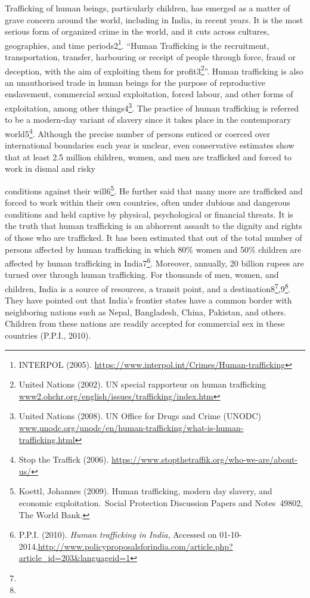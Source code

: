 \begin{multicols}{2}
\noi
Trafficking of human beings, particularly children, has emerged as a matter of grave concern around the world, including in India, in recent years. It is the most serious form of organized crime in the world, and it cuts across cultures, geographies, and time periods2\footnote{INTERPOL (2005). \url{https://www.interpol.int/Crimes/Human-trafficking}}. “Human Trafficking is the recruitment, transportation, transfer, harbouring or receipt of people through force, fraud or deception, with the aim of exploiting them for profit3\footnote{United Nations (2002). UN special rapporteur on human trafficking	\url{www2.ohchr.org/english/issues/trafficking/index.htm}}”. Human trafficking is also an unauthorised trade in human beings for the purpose of reproductive enslavement, commercial sexual exploitation, forced labour, and other forms of exploitation, among other things4\footnote{United Nations (2008). UN Office for Drugs and Crime (UNODC)	                                                                                                                                   \url{www.unodc.org/unodc/en/human-trafficking/what-is-human-trafficking.html}}. The practice of human trafficking is referred to be a modern-day variant of slavery since it takes place in the contemporary world5\footnote{Stop the Traffick (2006).  \url{https://www.stopthetraffik.org/who-we-are/about-us/}}. Although the precise number of persons enticed or coerced over international boundaries each year is unclear, even conservative estimates show that at least 2.5 million children, women, and men are trafficked and forced to work in dismal and risky 

conditions against their will6\footnote{Koettl, Johannes (2009). Human trafficking, modern day slavery, and economic exploitation. Social Protection Discussion Papers and Notes 49802, The World Bank.}. He further said that many more are trafficked and forced to work within their own countries, often under dubious and dangerous conditions and held captive by physical, psychological or financial threats. It is the truth that human trafficking is an abhorrent assault to the dignity and rights of those who are trafficked. It has been estimated that out of the total number of persons affected by human trafficking in which 80\% women and 50\% children are affected by human trafficking in India7\footnote{P.P.I. (2010).  {\it Human trafficking in India}, Accessed on 01-10-2014,\url{http://www.policyproposalsforindia.com/article.php?article_id=203&languageid=1}}. Moreover, annually, 20 billion rupees are turned over through human trafficking. For thousands of men, women, and children, India is a source of resources, a transit point, and a destination8\footnote{},9\footnote{}. They have pointed out that India's frontier states have a common border with neighboring nations such as Nepal, Bangladesh, China, Pakistan, and others. Children from these nations are readily accepted for commercial sex in these countries (P.P.I., 2010).



\end{multicols}
